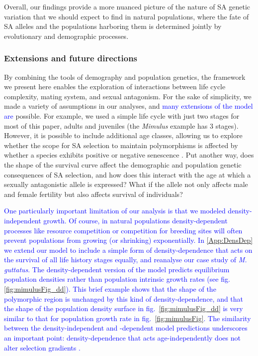 \documentclass[11pt]{article}
\begin{document}
Overall, our findings provide a more nuanced picture of the nature of SA genetic variation that we should expect to find in natural populations, where the fate of SA alleles and the populations harboring them is determined jointly by evolutionary and demographic processes.



\subsubsection*{Extensions and future directions}\label{subsubsec:extensions}

By combining the tools of demography and population genetics, the framework we present here enables the exploration of interactions between life cycle complexity, mating system, and sexual antagonism. For the sake of simplicity, we made a variety of assumptions in our analyses, and \textcolor{blue}{many extensions of the model are} possible. For example, we used a simple life cycle with just two stages for most of this paper, adults and juveniles (the \textit{Mimulus} example has $3$ stages). However, it is possible to include additional age classes, allowing us to explore whether the scope for SA selection to maintain polymorphisms is affected by whether a species exhibits positive or negative senescence \citep{jones2014diversity}. Put another way, does the shape of the survival curve affect the demographic and population genetic consequences of SA selection, and how does this interact with the age at which a sexually antagonistic allele is expressed? What if the allele not only affects male and female fertility but also affects survival of individuals? 

\textcolor{blue}{One particularly important limitation of our analysis is that we modeled density-independent growth. Of course, in natural populations density-dependent processes like resource competition or competition for breeding sites will often prevent populations from growing (or shrinking) exponentially. In \ref{App:DensDep} we extend our model to include a simple form of density-dependence that acts on the survival of all life history stages equally, and reanalyse our case study of \textit{M. guttatus}. The density-dependent version of the model predicts equilibrium population densities rather than population intrinsic growth rates (see fig.~ \ref{fig:mimulusFig_dd}). This brief example shows that the shape of the polymorphic region is unchanged by this kind of density-dependence, and that the shape of the population density surface in fig.~\ref{fig:mimulusFig_dd} is very similar to that for population growth rate in fig.~\ref{fig:mimulusFig}. The similarity between the density-independent and -dependent model predictions underscores an important point: density-dependence that acts age-independently does not alter selection gradients \citep{mylius1995evolutionarily, caswell2017}.}
\end{document}

